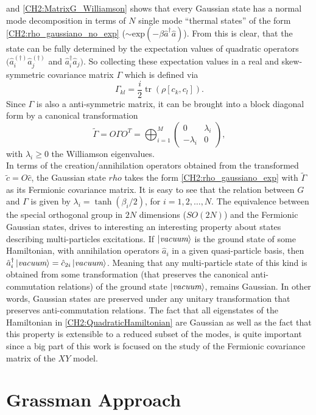 and \eqref{CH2:MatrixG_Williamson} shows that every Gaussian state has a normal mode decomposition in terms of $N$ single mode ``thermal states'' of the form \eqref{CH2:rho_gaussiano_no_exp} ($\sim \text{exp}(-\beta \hat{a}^{\dagger}\hat{a})$)\cite{kraus_pairing_2009}. From this is clear, that the state can be fully determined by the expectation values of quadratic operators $(\hat{a}_i^{(\dagger)}\hat{a}_j^{(\dagger)}$ and  $\hat{a}^{\dagger}_i\hat{a}_j)$. So collecting these expectation values in a real and skew-symmetric covariance matrix $\Gamma$ which is defined via
\begin{equation}
\Gamma_{k l}=\frac{i}{2} \operatorname{tr}\left(\rho\left[c_{k}, c_{l}\right]\right).
\label{CH2:Cov_matrix_elements}
\end{equation}
Since $\Gamma$ is also a anti-symmetric matrix, it can be brought into a block diagonal form by a canonical transformation
\begin{equation}
\tilde{\Gamma} = O \Gamma O^{T}=\bigoplus_{i=1}^{M}\left(\begin{array}{cc}
0 & \lambda_{i} \\
-\lambda_{i} & 0
\end{array}\right),
\label{CH2:Williamson_Cov_fermionic_matrix}
\end{equation}
with $\lambda_i\geq 0$ the Williamson eigenvalues.\\
In terms of the creation/annihilation operators obtained from the transformed $\tilde{c}=O\hat{c}$, the Gaussian state $rho$ takes the form \eqref{CH2:rho_gaussiano_exp} with $\tilde{\Gamma}$ as its Fermionic covariance matrix. It is easy to see that the relation between $G$ and $\Gamma$ is given by $\lambda_{i} = \tanh{\left(\beta_{i}/2\right)}$, for $i=1,2,\ldots,N$\cite{kraus_pairing_2009}. 
\newline
The equivalence between the special orthogonal group in $2N$ dimensions ($SO(2N)$) and the Fermionic Gaussian states, drives to interesting an interesting  property about states describing multi-particles excitations. If $\mathinner{|{\textit{vacuum}}\rangle}$ is the ground state of some Hamiltonian, with annihilation operators $\hat{a}_{i}$ in a given quasi-particle basis, then $\hat{a}_{i}^{\dagger}\mathinner{|{\textit{vacuum}}\rangle} = \hat{c}_{2i}\mathinner{|{\textit{vacuum}}\rangle}$. Meaning that any multi-particle state of this kind is obtained from some transformation (that preserves the canonical anti-commutation relations) of the ground state $\mathinner{|{\textit{vacuum}}\rangle}$, remains Gaussian. In other words, Gaussian states are preserved under any unitary transformation that preserves anti-commutation relations.
\newline 
The fact that all eigenstates of the Hamiltonian in \eqref{CH2:QuadraticHamiltonian} are Gaussian as well as the fact that this property is extensible to a reduced subset of the modes, is quite important since a big part of this work is focused on the study of the Fermionic covariance matrix of the $XY$ model.
\section{Grassman Approach}











